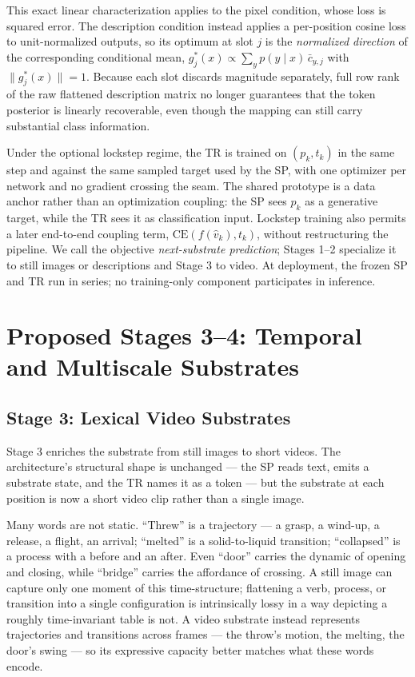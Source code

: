 \documentclass[11pt,a4paper]{article}
\begin{document}
This exact linear characterization applies to the pixel condition, whose loss is squared error. The description condition instead applies a per-position cosine loss to unit-normalized outputs, so its optimum at slot $j$ is the \emph{normalized direction} of the corresponding conditional mean, $g_j^*(x) \propto \sum_y p(y \mid x)\,\bar c_{y,j}$ with $\lVert g_j^*(x)\rVert = 1$. Because each slot discards magnitude separately, full row rank of the raw flattened description matrix no longer guarantees that the token posterior is linearly recoverable, even though the mapping can still carry substantial class information.

Under the optional lockstep regime, the TR is trained on $(p_k,t_k)$ in the same step and against the same sampled target used by the SP, with one optimizer per network and no gradient crossing the seam. The shared prototype is a data anchor rather than an optimization coupling: the SP sees $p_k$ as a generative target, while the TR sees it as classification input. Lockstep training also permits a later end-to-end coupling term, $\text{CE}(f(\hat v_k),t_k)$, without restructuring the pipeline. We call the objective \emph{next-substrate prediction}; Stages 1--2 specialize it to still images or descriptions and Stage 3 to video. At deployment, the frozen SP and TR run in series; no training-only component participates in inference.

\section{Proposed Stages 3--4: Temporal and Multiscale Substrates}

\subsection{Stage 3: Lexical Video Substrates}

Stage 3 enriches the substrate from still images to short videos. The architecture's structural shape is unchanged --- the SP reads text, emits a substrate state, and the TR names it as a token --- but the substrate at each position is now a short video clip rather than a single image.

Many words are not static. ``Threw'' is a trajectory --- a grasp, a wind-up, a release, a flight, an arrival; ``melted'' is a solid-to-liquid transition; ``collapsed'' is a process with a before and an after. Even ``door'' carries the dynamic of opening and closing, while ``bridge'' carries the affordance of crossing. A still image can capture only one moment of this time-structure; flattening a verb, process, or transition into a single configuration is intrinsically lossy in a way depicting a roughly time-invariant table is not. A video substrate instead represents trajectories and transitions across frames --- the throw's motion, the melting, the door's swing --- so its expressive capacity better matches what these words encode.
\end{document}
